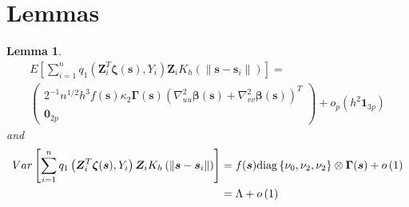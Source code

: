 \documentclass[authoryear,review, 12pt]{elsarticle}
\newtheorem{lem}{Lemma}
\begin{document}
\section{Lemmas}
\begin{lem}
\label{lemma:omega}
\begin{multline*}
E\left[\sum_{i=1}^{n}q_{1}\left(\bm{Z}_{i}^{T}\bm{\zeta}(\bm{s}),Y_{i}\right)\bm{Z}_{i}K_{h}\left(\|\bm{s}-\bm{s}_{i}\|\right)\right]=\\
\left(\begin{array}{c}
2^{-1}n^{1/2}h^{3}f(\bm{s})\kappa_{2}\bm{\Gamma}(\bm{s})\left(\nabla_{uu}^{2}\bm{\beta}(\bm{s})+\nabla_{vv}^{2}\bm{\beta}(\bm{s})\right)^{T}\\
\bm{0}_{2p}
\end{array}\right)+o_{p}\left(h^{2}\bm{1}_{3p}\right)
\end{multline*}
and
\begin{align*}
Var\left[\sum_{i=1}^{n}q_{1}\left(\bm{Z}_{i}^{T}\bm{\zeta}(\bm{s}),Y_{i}\right)\bm{Z}_{i}K_{h}\left(\|\bm{s}-\bm{s}_{i}\|\right)\right] &= f(\bm{s}){\rm diag}\left\{ \nu_{0},\nu_{2},\nu_{2}\right\} \otimes\bm{\Gamma}(\bm{s})+o\left(1\right)\\
&= \Lambda+o\left(1\right)
\end{align*}
\end{lem}
\end{document}
